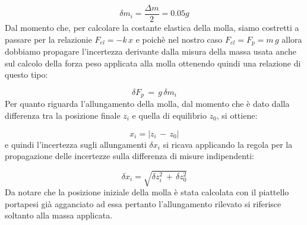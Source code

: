 \begin{equation*}
	\delta m_i = \frac{\Delta m}{2} = 0.05 g 
\end{equation*}
%
Dal momento che, per calcolare la costante elastica della molla, siamo costretti a passare per la relazionie $F_{el} = -k\,x$ e poichè nel nostro caso $F_{el} = F_{p} = m\,g$ allora dobbiamo propagare l'incertezza derivante dalla misura della massa usata anche sul calcolo della forza peso applicata alla molla ottenendo quindi una relazione di questo tipo:

\begin{equation*}
	\delta F_{p}\, =\, g\,\delta m_i
\end{equation*}
%
Per quanto riguarda l'allungamento della molla, dal momento che è dato dalla differenza tra la posizione finale $z_i$ e quella di equilibrio $z_0$, si ottiene:

\begin{equation*}
	x_i = |z_i\,-\,z_0|
\end{equation*}
%
e quindi l’incertezza sugli allungamenti $\delta x_i$ si ricava applicando la regola per la propagazione delle incertezze sulla differenza di misure indipendenti:

\begin{equation*}
	\delta x_i = \sqrt{\delta z_i^2\, + \,\delta z_0^2}
\end{equation*}
%
Da notare che la posizione iniziale della molla è stata calcolata con il piattello portapesi già agganciato ad essa pertanto l'allungamento rilevato si riferisce soltanto alla massa applicata.\\

